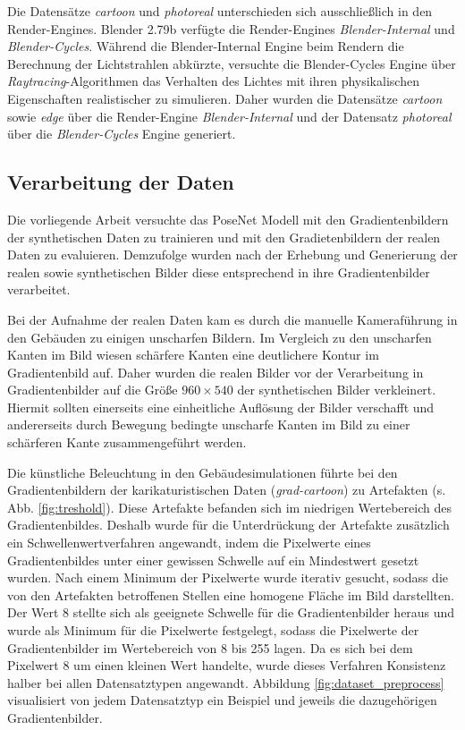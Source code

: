 Die Datensätze \textit{cartoon} und \textit{photoreal} unterschieden sich ausschließlich in den Render-Engines. Blender 2.79b verfügte die Render-Engines \textit{Blender-Internal} und \textit{Blender-Cycles}. Während die Blender-Internal Engine beim Rendern die Berechnung der Lichtstrahlen abkürzte, versuchte die Blender-Cycles Engine über \textit{Raytracing}-Algorithmen das Verhalten des Lichtes mit ihren physikalischen Eigenschaften realistischer zu simulieren. Daher wurden die Datensätze \textit{cartoon} sowie \textit{edge} über die Render-Engine \textit{Blender-Internal} und der Datensatz \textit{photoreal} über die \textit{Blender-Cycles} Engine generiert.

\subsection{Verarbeitung der Daten}
Die vorliegende Arbeit versuchte das PoseNet Modell mit den Gradientenbildern der synthetischen Daten zu trainieren und mit den Gradietenbildern der realen Daten zu evaluieren. Demzufolge wurden nach der Erhebung und Generierung der realen sowie synthetischen Bilder diese entsprechend in ihre Gradientenbilder verarbeitet. 

Bei der Aufnahme der realen Daten kam es durch die manuelle Kameraführung in den Gebäuden zu einigen unscharfen Bildern. Im Vergleich zu den unscharfen Kanten im Bild wiesen schärfere Kanten eine deutlichere Kontur im Gradientenbild auf. Daher wurden die realen Bilder vor der Verarbeitung in Gradientenbilder auf die Größe $960 \times 540$ der synthetischen Bilder verkleinert. Hiermit sollten einerseits eine einheitliche Auflösung der Bilder verschafft und andererseits durch Bewegung bedingte unscharfe Kanten im Bild zu einer schärferen Kante zusammengeführt werden.

Die künstliche Beleuchtung in den Gebäudesimulationen führte bei den Gradientenbildern der karikaturistischen Daten (\textit{grad-cartoon}) zu Artefakten (s. Abb. \ref{fig:treshold}). Diese Artefakte befanden sich im niedrigen Wertebereich des Gradientenbildes. Deshalb wurde für die Unterdrückung der Artefakte zusätzlich ein Schwellenwertverfahren angewandt, indem die Pixelwerte eines Gradientenbildes unter einer gewissen Schwelle auf ein Mindestwert gesetzt wurden. Nach einem Minimum der Pixelwerte wurde iterativ gesucht, sodass die von den Artefakten betroffenen Stellen eine homogene Fläche im Bild darstellten. Der Wert 8 stellte sich als geeignete Schwelle für die Gradientenbilder heraus und wurde als Minimum für die Pixelwerte festgelegt, sodass die Pixelwerte der Gradientenbilder im Wertebereich von 8 bis 255 lagen. Da es sich bei dem Pixelwert 8 um einen kleinen Wert handelte, wurde dieses Verfahren Konsistenz halber bei allen Datensatztypen angewandt. Abbildung \ref{fig:dataset_preprocess} visualisiert von jedem Datensatztyp ein Beispiel und jeweils die dazugehörigen Gradientenbilder.


